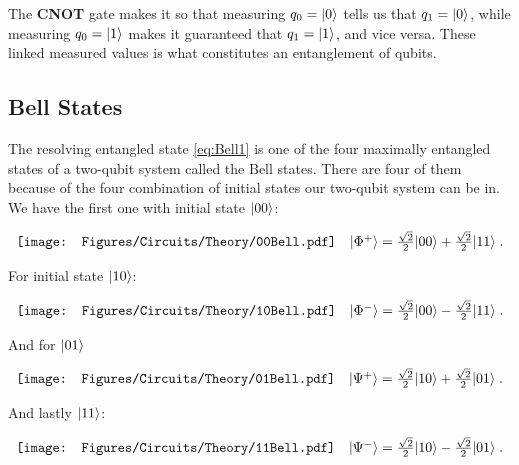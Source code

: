 The \textbf{CNOT} gate makes it so that measuring $q_0 = \ket{0}$ tells us that $q_1 = \ket{0}$, while measuring $q_0 = \ket{1}$ makes it guaranteed that $q_1 = \ket{1}$, and vice versa. These linked measured values is what constitutes an entanglement of qubits.

\subsection{Bell States}

The resolving entangled state \ref{eq:Bell1} is one of the four maximally entangled states of a two-qubit system called the Bell states. There are four of them because of the four combination of initial states our two-qubit system can be in. We have the first one with initial state $\ket{00}$:

\begin{equation}\label{eq:00Bell}
    \begin{array}{cc}
        \texttt{[image: Figures/Circuits/Theory/00Bell.pdf]} &  \ket{\Phi^+} = \frac{\sqrt{2}}{2} |00\rangle+\frac{\sqrt{2}}{2} |11\rangle \; .
    \end{array}
\end{equation}

For initial state $\ket{10}$:

\begin{equation}\label{eq:10Bell}
    \begin{array}{cc}
        \texttt{[image: Figures/Circuits/Theory/10Bell.pdf]} &  \ket{\Phi^-} = \frac{\sqrt{2}}{2} |00\rangle-\frac{\sqrt{2}}{2} |11\rangle \; .
    \end{array}
\end{equation}

And for $\ket{01}$

\begin{equation}\label{eq:01Bell}
    \begin{array}{cc}
        \texttt{[image: Figures/Circuits/Theory/01Bell.pdf]} &  \ket{\Psi^+} = \frac{\sqrt{2}}{2} |10\rangle+\frac{\sqrt{2}}{2} |01\rangle \; .
    \end{array}
\end{equation}

And lastly $\ket{11}$:

\begin{equation}\label{eq:11Bell}
    \begin{array}{cc}
        \texttt{[image: Figures/Circuits/Theory/11Bell.pdf]} &  \ket{\Psi^-} = \frac{\sqrt{2}}{2} |10\rangle-\frac{\sqrt{2}}{2} |01\rangle \; .
    \end{array}
\end{equation}